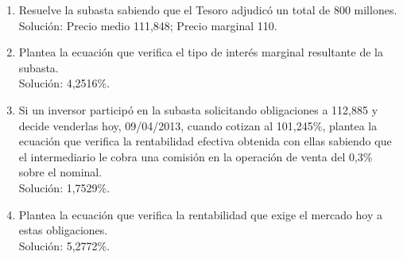 \begin{enumerate}[label=\alph*)]
    \item Resuelve la subasta sabiendo que el Tesoro adjudicó un total de 800 millones.\\
    Solución: Precio medio 111,848; Precio marginal 110.


    \item Plantea la ecuación que verifica el tipo de interés marginal resultante de la subasta.\\
    Solución: 4,2516\%.

    \item Si un inversor participó en la subasta solicitando obligaciones a 112,885 y decide venderlas hoy, 09/04/2013, cuando cotizan al 101,245\%, plantea la ecuación que verifica la rentabilidad efectiva obtenida con ellas sabiendo que el intermediario le cobra una comisión en la operación de venta del 0,3\% sobre el nominal.\\
    Solución: 1,7529\%.

    \item Plantea la ecuación que verifica la rentabilidad que exige el mercado hoy a estas obligaciones.\\
    Solución: 5,2772\%.
\end{enumerate}


